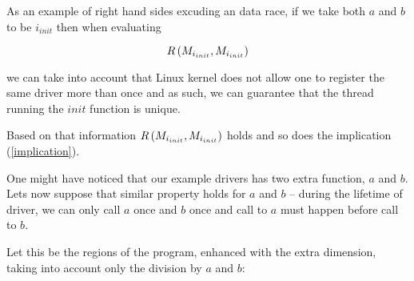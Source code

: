 \documentclass[..thesis.tex]{subfiles}
\begin{document}
As an example of right hand sides excuding an data race, if we take both $a$ and $b$ to be $i_{init}$ then when evaluating 

\begin{equation*}
R \left( M_{i_{init}}, M_{i_{init}} \right)
\end{equation*} 

we can take into account that Linux kernel does not allow one to register the same driver more than once and as such, we can guarantee that the thread running the $init$ function is unique.

Based on that information $R \left( M_{i_{init}}, M_{i_{init}} \right)$ holds and so does the implication (\ref{implication}).



One might have noticed that our example drivers has two extra function, $a$ and $b$. Lets now suppose that similar property holds for $a$ and $b$ -- during the lifetime of driver, we can only call $a$ once and $b$ once and call to $a$  must happen before call to $b$.

Let this be the regions of the program, enhanced with the extra dimension, taking into account only the division by $a$ and $b$:



\end{document}
